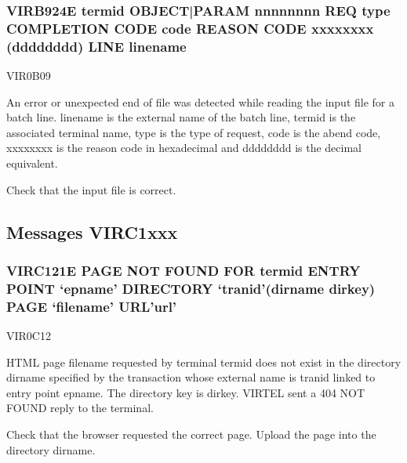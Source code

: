 \documentclass[letterpaper,10pt,english]{sphinxmanual}
\begin{document}
\subsubsection{VIRB924E termid OBJECT|PARAM nnnnnnnn REQ type COMPLETION CODE code REASON CODE xxxxxxxx (dddddddd) LINE linename}
\label{\detokenize{messages:virb924e-termid-object-param-nnnnnnnn-req-type-completion-code-code-reason-code-xxxxxxxx-dddddddd-line-linename}}\begin{description}
\sphinxAtStartPar
VIR0B09

\sphinxAtStartPar
An error or unexpected end of file was detected while reading the input file for a batch line. linename is the external name of the batch line, termid is the associated terminal name, type is the type of request, code is the abend code, xxxxxxxx is the reason code in hexadecimal and dddddddd is the decimal equivalent.

\sphinxAtStartPar
Check that the input file is correct.

\end{description}


\subsection{Messages VIRC1xxx}
\label{\detokenize{messages:messages-virc1xxx}}

\subsubsection{VIRC121E PAGE NOT FOUND FOR termid ENTRY POINT ‘epname’ DIRECTORY ‘tranid’(dirname dirkey) PAGE ‘filename’ URL’url’}
\label{\detokenize{messages:virc121e-page-not-found-for-termid-entry-point-epname-directory-tranid-dirname-dirkey-page-filename-url-url}}\begin{description}
\sphinxAtStartPar
VIR0C12

\sphinxAtStartPar
HTML page filename requested by terminal termid does not exist in the directory dirname specified by the transaction whose external name is tranid linked to entry point epname. The directory key is dirkey. VIRTEL sent a 404 NOT FOUND reply to the terminal.

\sphinxAtStartPar
Check that the browser requested the correct page. Upload the page into the directory dirname.

\end{description}
\end{document}
